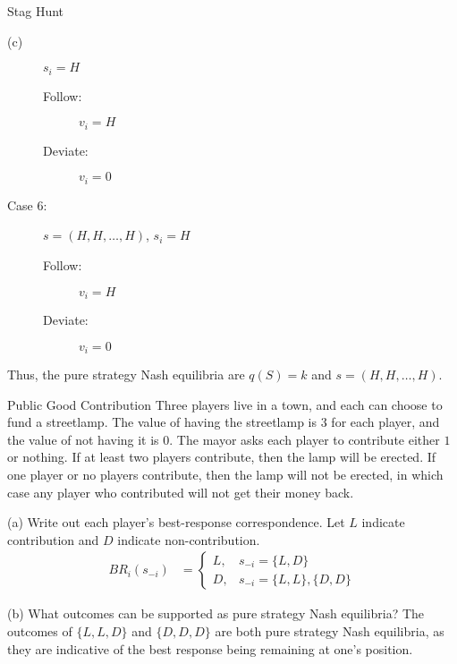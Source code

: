 \documentclass[10pt]{extarticle}
\begin{document}
\begin{problem}{Stag Hunt}
\begin{problem}{(c)}
\begin{multicols}{2}
\begin{description}
            $s_i = H$
            \begin{description}
              \item[Follow:] $v_i = H$
              \item[Deviate:] $v_i = 0$
            \end{description}
          \item[Case 6:] $s = (H,H,\dots,H)$, $s_i = H$
            \begin{description}
              \item[Follow:] $v_i = H$
              \item[Deviate:] $v_i = 0$
            \end{description} %
        \end{description}
      \end{multicols}
      Thus, the pure strategy Nash equilibria are $q(S) = k$ and $s = (H,H,\dots,H)$.
    \end{problem}
  \end{problem}
  \begin{problem}{Public Good Contribution}
    Three players live in a town, and each can choose to fund a streetlamp. The value of having the streetlamp is $3$ for each player, and the value of not having it is $0$. The mayor asks each player to contribute either $1$ or nothing. If at least two players contribute, then the lamp will be erected. If one player or no players contribute, then the lamp will not be erected, in which case any player who contributed will not get their money back.
    \begin{problem}{(a)}
      Write out each player's best-response correspondence.
      \tcblower
      Let $L$ indicate contribution and $D$ indicate non-contribution.
      \begin{align*}
        BR_i(s_{-i}) &= \begin{cases}
          L,& s_{-i} = \{L,D\}\\
          D,& s_{-i} = \{L,L\},\{D,D\}
        \end{cases}
      \end{align*}
    \end{problem}
    \begin{problem}{(b)}
      What outcomes can be supported as pure strategy Nash equilibria?
      \tcblower
      The outcomes of $\{L,L,D\}$ and $\{D,D,D\}$ are both pure strategy Nash equilibria, as they are indicative of the best response being remaining at one's position.
    \end{problem}
  \end{problem}
\end{document}
